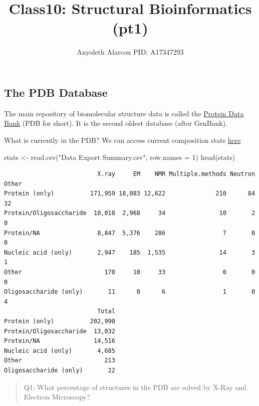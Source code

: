 \documentclass[
  letterpaper,
  DIV=11,
  numbers=noendperiod]{scrartcl}
\title{Class10: Structural Bioinformatics (pt1)}
\author{Anyoleth Alarcon PID: A17347293}
\date{}
\newenvironment{Shaded}{\begin{snugshade}}{\end{snugshade}}
\newcommand{\AttributeTok}[1]{\textcolor[rgb]{0.40,0.45,0.13}{#1}}
\newcommand{\DecValTok}[1]{\textcolor[rgb]{0.68,0.00,0.00}{#1}}
\newcommand{\FunctionTok}[1]{\textcolor[rgb]{0.28,0.35,0.67}{#1}}
\newcommand{\NormalTok}[1]{\textcolor[rgb]{0.00,0.23,0.31}{#1}}
\newcommand{\OtherTok}[1]{\textcolor[rgb]{0.00,0.23,0.31}{#1}}
\newcommand{\StringTok}[1]{\textcolor[rgb]{0.13,0.47,0.30}{#1}}
\renewcommand*\contentsname{Table of contents}
\newcommand\contentsname{Table of contents}
\begin{document}
\maketitle

\renewcommand*\contentsname{Table of contents}
{
\hypersetup{linkcolor=}
\setcounter{tocdepth}{3}
\tableofcontents
}

\subsection{The PDB Database}\label{the-pdb-database}

The main repository of biomolecular structure data is called the
\href{https://www.rcsb.org}{Protein Data Bank} (PDB for short). It is
the second oldest database (after GenBank).

What is currently in the PDB? We can access current composition stats
\href{https://www.rcsb.org/stats}{here}

\begin{Shaded}
\begin{Highlighting}[]
\NormalTok{stats }\OtherTok{\textless{}{-}} \FunctionTok{read.csv}\NormalTok{(}\StringTok{"Data Export Summary.csv"}\NormalTok{, }\AttributeTok{row.names =} \DecValTok{1}\NormalTok{)}
\FunctionTok{head}\NormalTok{(stats)}
\end{Highlighting}
\end{Shaded}

\begin{verbatim}
                          X.ray     EM    NMR Multiple.methods Neutron Other
Protein (only)          171,959 18,083 12,622              210      84    32
Protein/Oligosaccharide  10,018  2,968     34               10       2     0
Protein/NA                8,847  5,376    286                7       0     0
Nucleic acid (only)       2,947    185  1,535               14       3     1
Other                       170     10     33                0       0     0
Oligosaccharide (only)       11      0      6                1       0     4
                          Total
Protein (only)          202,990
Protein/Oligosaccharide  13,032
Protein/NA               14,516
Nucleic acid (only)       4,685
Other                       213
Oligosaccharide (only)       22
\end{verbatim}

\begin{quote}
Q1: What percentage of structures in the PDB are solved by X-Ray and
Electron Microscopy?
\end{quote}
\end{document}
